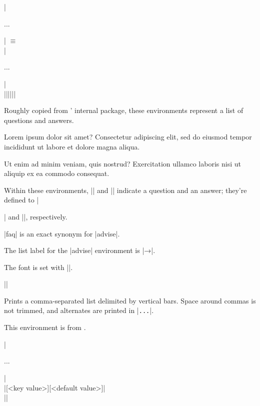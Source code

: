 \documentclass{ltxguidex}
\def\labeladvise{→}
\begin{document}
\begin{desc}
|\begin{advise}...\end{advise}| $\equiv$\\
|\begin{faq}...\end{faq}|\\
|\Q|\qquad|\A|\qquad|\advisespace|
\end{desc}

Roughly copied from ' internal  package,
these environments represent a list of questions and answers.

\begin{LTXexample}
\begin{faq}
\Q Lorem ipsum dolor sit amet?
\A Consectetur adipiscing elit, sed do eiusmod tempor incididunt ut labore et dolore magna aliqua.

\Q Ut enim ad minim veniam, quis nostrud?
\A Exercitation ullamco laboris nisi ut aliquip ex ea commodo consequat.
\end{faq}
\end{LTXexample}

Within these environments, |\Q| and |\A| indicate a question and an answer;
they're defined to |\item| and |\advisespace|, respectively.

\begin{note}
	|faq| is an exact synonym for |advise|.

	The list label for the |advise| environment is |\labeladvise|.

	The font is set with |\advisestyle|.
\end{note}

\begin{desc}
||
\end{desc}

Prints a comma-separated list delimited by vertical bars. Space around
commas is not trimmed, and alternates are printed in
|\textup{\texttt{...}}|.

This environment is from .

\begin{LTXexample}
\end{LTXexample}

\begin{desc}
|\begin{keys}...\end{keys}|\\
|[<key value>][<default value>]|\\
|\bool|
\end{desc}
\end{document}
